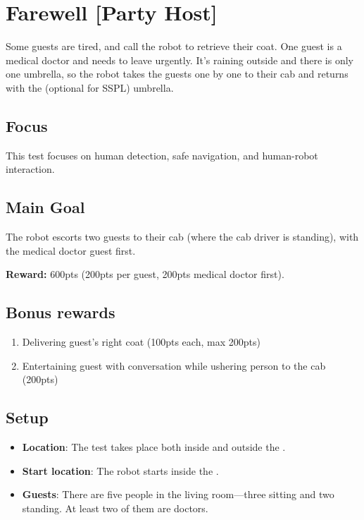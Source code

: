 \section{Farewell [Party Host]}
\label{test:farewell}
Some guests are tired, and call the robot to retrieve their coat. One guest is a medical doctor and needs to leave urgently. It's raining outside and there is only one umbrella, so the robot takes the guests one by one to their cab and returns with the (optional for SSPL) umbrella.

\subsection*{Focus}
This test focuses on human detection, safe navigation, and human-robot interaction.

\subsection*{Main Goal}
The robot escorts two guests to their cab (where the cab driver is standing), with the medical doctor guest first.

\noindent\textbf{Reward:} 600pts (200pts per guest, 200pts medical doctor first).

\subsection*{Bonus rewards}
\begin{enumerate}[nosep]
	\item Delivering guest's right coat (100pts each, max 200pts)
	\item Entertaining guest with conversation while ushering person to the cab (200pts)	
\end{enumerate}


\subsection*{Setup}
\begin{itemize}
	\item \textbf{Location}: The test takes place both inside and outside the \Arena{}.
	\item \textbf{Start location}: The robot starts inside the \Arena{}.
	\item \textbf{Guests}: There are five people in the living room---three sitting and two standing. At least two of them are doctors.
\end{itemize}

